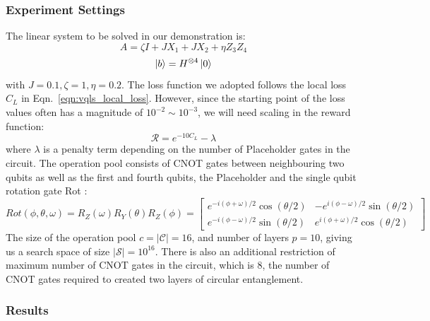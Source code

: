 \documentclass[a4paper,onecolumn,11pt]{quantumarticle}
\begin{document}
\subsubsection{Experiment Settings}
The linear system to be solved in our demonstration is:
\begin{equation}
    A = \zeta  I + J X_1 + J X_2  + \eta Z_3 Z_4
\end{equation}
\begin{equation}
    \ket{b} = H^{\otimes 4}\ket{0}
\end{equation}
with $J = 0.1, \zeta = 1, \eta = 0.2$.
The loss function we adopted follows the local loss $C_L$ in Eqn.~\ref{eqn:vqls_local_loss}. However, since the starting point of the loss values often has a magnitude of $10^{-2}\sim 10^{-3}$, we will need scaling in the reward function:
\begin{equation}
    \mathcal{R} = e^{-10 C_L}-\lambda
\end{equation}
where $\lambda$ is a penalty term depending on the number of Placeholder gates in the circuit. The operation pool consists of CNOT gates between neighbouring two qubits as well as the first and fourth qubits, the Placeholder and the single qubit rotation gate Rot \cite{nielsen00}:
\begin{equation}
Rot(\phi, \theta, \omega)=R_Z(\omega) R_Y(\theta) R_Z(\phi)=\left[\begin{array}{cc}
e^{-i(\phi+\omega) / 2} \cos (\theta / 2) & -e^{i(\phi-\omega) / 2} \sin (\theta / 2) \\
e^{-i(\phi-\omega) / 2} \sin (\theta / 2) & e^{i(\phi+\omega) / 2} \cos (\theta / 2)
\end{array}\right]
\end{equation}
The size of the operation pool $c = \vert \mathcal{C}\vert = 16$, and number of layers $p = 10$, giving us a search space of size $\vert \mathcal{S} \vert = 10^{16}$. There is also an additional restriction of maximum number of CNOT gates in the circuit, which is 8, the number of CNOT gates required to created two layers of circular entanglement.
\subsubsection{Results}
\end{document}
